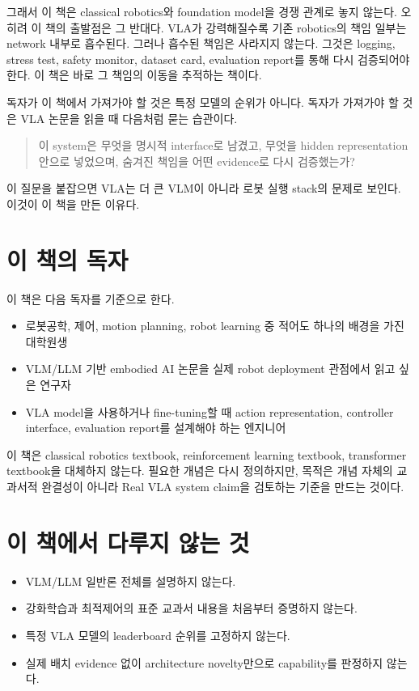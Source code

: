 그래서 이 책은 classical robotics와 foundation model을 경쟁 관계로 놓지 않는다. 오히려 이 책의 출발점은 그 반대다. VLA가 강력해질수록 기존 robotics의 책임 일부는 network 내부로 흡수된다. 그러나 흡수된 책임은 사라지지 않는다. 그것은 logging, stress test, safety monitor, dataset card, evaluation report를 통해 다시 검증되어야 한다. 이 책은 바로 그 책임의 이동을 추적하는 책이다.

독자가 이 책에서 가져가야 할 것은 특정 모델의 순위가 아니다. 독자가 가져가야 할 것은 VLA 논문을 읽을 때 다음처럼 묻는 습관이다.

\begin{quote}
이 system은 무엇을 명시적 interface로 남겼고, 무엇을 hidden representation 안으로 넣었으며, 숨겨진 책임을 어떤 evidence로 다시 검증했는가?
\end{quote}

이 질문을 붙잡으면 VLA는 더 큰 VLM이 아니라 로봇 실행 stack의 문제로 보인다. 이것이 이 책을 만든 이유다.

\section*{이 책의 독자}

이 책은 다음 독자를 기준으로 한다.

\begin{itemize}
  \item 로봇공학, 제어, motion planning, robot learning 중 적어도 하나의 배경을 가진 대학원생
  \item VLM/LLM 기반 embodied AI 논문을 실제 robot deployment 관점에서 읽고 싶은 연구자
  \item VLA model을 사용하거나 fine-tuning할 때 action representation, controller interface, evaluation report를 설계해야 하는 엔지니어
\end{itemize}

이 책은 classical robotics textbook, reinforcement learning textbook, transformer textbook을 대체하지 않는다. 필요한 개념은 다시 정의하지만, 목적은 개념 자체의 교과서적 완결성이 아니라 Real VLA system claim을 검토하는 기준을 만드는 것이다.

\section*{이 책에서 다루지 않는 것}

\begin{itemize}
  \item VLM/LLM 일반론 전체를 설명하지 않는다.
  \item 강화학습과 최적제어의 표준 교과서 내용을 처음부터 증명하지 않는다.
  \item 특정 VLA 모델의 leaderboard 순위를 고정하지 않는다.
  \item 실제 배치 evidence 없이 architecture novelty만으로 capability를 판정하지 않는다.
\end{itemize}

